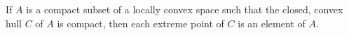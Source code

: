 If $A$ is a compact subset of a locally convex space such that the closed, convex hull $C$ of $A$ is compact, then each extreme point of $C$ is an element of $A$.
